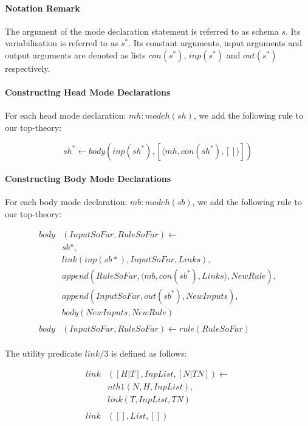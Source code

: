 \documentclass{article}
\theoremstyle{plain}
\theoremstyle{definition}
\begin{document}
\begin{multicols}{2}
\paragraph{Notation Remark} The argument of the mode declaration statement is referred to as schema $s$. Its variabilisation is referred to as $s^*$. Its constant arguments, input arguments and output arguments are denoted as lists $con(s^*)$, $inp(s^*)$ and $out(s^*)$ respectively.

\paragraph{Constructing Head Mode Declarations} For each head mode declaration: $mh: modeh(sh)$, we add the following rule to our top-theory:

$$sh^* \leftarrow body(inp(sh^*), [\langle mh, con(sh^*), [] \rangle])$$


\paragraph{Constructing Body Mode Declarations} For each body mode declaration: $mb: modeh(sb)$, we add the following rule to our top-theory:

{\footnotesize
\begin{align*}
body&(InputSoFar, RuleSoFar) \leftarrow\\
& sb*,\\
& link(inp(sb*), InputSoFar, Links),\\
& append(RuleSoFar, \langle mb, con(sb^*), Links\rangle, NewRule),\\
& append(InputSoFar, out(sb^*), NewInputs),\\
& body(NewInputs, NewRule)\\
\\
body&(InputSoFar, RuleSoFar) \leftarrow rule(RuleSoFar)
\end{align*}
}

\paragraph{} The utility predicate $link/3$ is defined as follows:

\begin{align*}
link&([H|T], InpList, [N|TN]) \leftarrow\\
& nth1(N, H, InpList),\\
& link(T, InpList, TN)\\
\\
link&([], List, [])
\end{align*}


\end{multicols}
\end{document}
